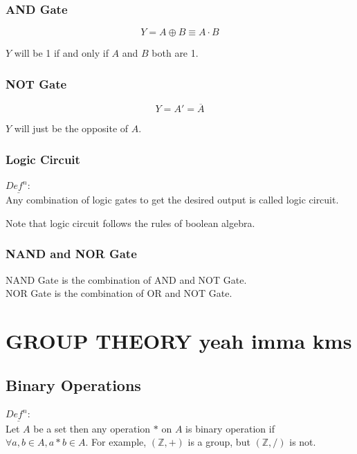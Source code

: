 \documentclass[11pt,letterpaper]{article}
\newenvironment{definition}
	{\begin{mdframed}$\underline{\textit{Def}^\textit{n}:} $\\}
	{\end{mdframed}}
\begin{document}
\subsubsection{AND Gate}

\[
  Y = A \oplus B \equiv A \cdot B
\]

$Y$ will be 1 if and only if $A$ and $B$ both are 1.

\subsubsection{NOT Gate}

\[
  Y = A' = \overline{A}
\]

$Y$ will just be the opposite of $A$.

\subsubsection{Logic Circuit}
\begin{definition}
  Any combination of logic gates to get the desired output is called logic circuit.

  Note that logic circuit follows the rules of boolean algebra.
\end{definition}

\subsubsection{NAND and NOR Gate}

NAND Gate is the combination of AND and NOT Gate. \\ 
NOR Gate is the combination of OR and NOT Gate.



\section{GROUP THEORY yeah imma kms}
  
\subsection{Binary Operations}

\begin{definition}
  Let $A$ be a set then any operation $*$ on $A$ is binary operation if $\forall a, b \in A, a*b \in A$. 
  For example, $(\mathbb{Z},+)$ is a group, but $(\mathbb{Z},/)$ is not.
\end{definition}
\end{document}
